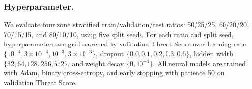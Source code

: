 \begin{table}[t!]
\begin{tcolorbox}
\begin{center}
\scriptsize
\setlength{\tabcolsep}{6pt}
\renewcommand{\arraystretch}{1.05}
\end{center}
\end{tcolorbox}
\end{table}

\subsubsection{Hyperparameter.}
We evaluate four zone stratified train/\allowbreak validation/\allowbreak test ratios:
50/25/25, 60/20/20, 70/15/15, and 80/10/10, using five split seeds. For each ratio and split seed, hyperparameters are grid searched by validation Threat Score over learning rate $\{10^{-4},\allowbreak 3{\times}10^{-4},\allowbreak 10^{-3},\allowbreak 3{\times}10^{-3}\}$,
dropout $\{0.0,0.1,0.2,0.3,0.5\}$, hidden width
$\{32,64,128,256,512\}$, and weight decay $\{0,10^{-4}\}$.
All neural models are trained with Adam, binary cross-entropy, and early stopping with patience 50 on validation Threat Score.

% 
